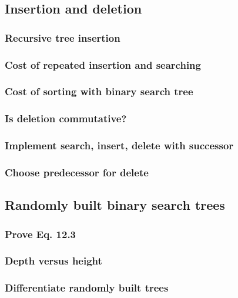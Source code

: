 \documentclass{article}
\begin{document}
\subsection{Insertion and deletion}

\subsubsection{Recursive tree insertion}

\subsubsection{Cost of repeated insertion and searching}

\subsubsection{Cost of sorting with binary search tree}

\subsubsection{Is deletion commutative?}

\subsubsection{Implement search, insert, delete with successor}

\subsubsection{Choose predecessor for delete}


\subsection{Randomly built binary search trees}

\subsubsection{Prove Eq. 12.3}

\subsubsection{Depth versus height}

\subsubsection{Differentiate randomly built trees}
\end{document}
